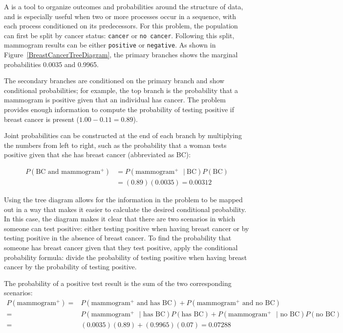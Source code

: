 A  is a tool to organize outcomes and probabilities around the structure of data, and is especially useful when two or more processes occur in a sequence, with each process  conditioned on its predecessors. For this problem, the population can first be split by cancer status: \texttt{cancer} or \texttt{no cancer}. Following this split, mammogram results can be either \texttt{positive} or \texttt{negative}. As shown in Figure~\ref{BreastCancerTreeDiagram}, the primary branches shows the marginal probabilities 0.0035 and 0.9965. 

The secondary branches are conditioned on the primary branch and show conditional probabilities; for example, the top branch is the probability that a mammogram is positive given that an individual has cancer. The problem provides enough information to compute the probability of testing positive if breast cancer is present ($1.00 - 0.11=0.89$). 

Joint probabilities can be constructed at the end of each branch by multiplying the numbers from left to right, such as the probability that a woman tests positive given that she has breast cancer (abbreviated as BC):

\begin{align*}
P(\text{BC and mammogram$^+$}) &= P(\text{mammogram$^+$ } |\ \text{BC})  P(\text{BC}) \\
	&= (0.89) (0.0035) = 0.00312
\end{align*}

Using the tree diagram allows for the information in the problem to be mapped out in a way that makes it easier to calculate the desired conditional probability. In this case, the diagram makes it clear that there are two scenarios in which someone can test positive: either testing positive when having breast cancer or by testing positive in the absence of breast cancer. To find the probability that someone has breast cancer given that they test positive, apply the conditional probability formula: divide the probability of testing positive when having breast cancer by the probability of testing positive.

The probability of a positive test result is the sum of the two corresponding scenarios:
\begin{align*}
P(\text{mammogram$^+$}) =&  P(\text{mammogram$^+$ and has BC}) + P(\text{mammogram$^+$ and no BC}) \\
=&P(\text{mammogram$^+$ } | \text{ has BC}) P(\text{has BC}) + P(\text{mammogram$^+$ } | \text{ no BC}) P(\text{no BC}) \\
=& (0.0035)(0.89) + (0.9965)(0.07) = 0.07288
\end{align*}

